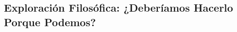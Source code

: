 \begin{refsection}
\chapter{Exploración Filosófica: ¿Deberíamos Hacerlo Porque Podemos?}
\label{chapter:chapter-19}

\begin{comment}
\begin{enumerate}
\item \textbf{Exploración Filosófica: ¿Deberíamos Hacerlo Porque Podemos? (Capítulo 19):}  
\begin{itemize}
    \item Reflexión filosófica sobre límites éticos en el progreso tecnológico.
    \item Análisis de dilemas éticos en IA general y biotecnología.
    \item Actividad: Diseñar un simulador de dilemas éticos en Python.
\end{itemize}
\end{enumerate}
\end{comment}



\nocite{*}

\printbibliography[heading=subbibliography, title={Bibliografía del Capítulo 19}]
\end{refsection}
